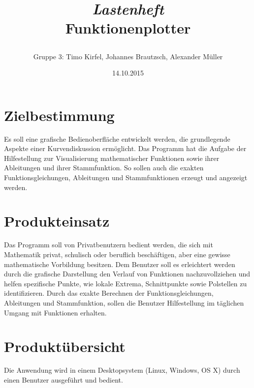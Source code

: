 \documentclass[a4paper]{article}
\title{\begin{center}
        \emph{{\Huge Lastenheft}} \\ {\large Funktionenplotter}
       \end{center} }
\author{{\normalsize Gruppe 3: Timo Kirfel, Johannes Brautzsch, Alexander Müller}}
\date{14.10.2015}
\begin{document}
  \maketitle
  \newpage

  \tableofcontents %
  \newpage

  \section{Zielbestimmung}
    Es soll eine grafische Bedienoberfläche entwickelt werden, die grundlegende Aspekte einer Kurvendiskussion ermöglicht. 
    Das Programm hat die Aufgabe der Hilfestellung zur Visualisierung mathematischer Funktionen sowie ihrer Ableitungen und ihrer Stammfunktion. So sollen auch die exakten Funktionsgleichungen, Ableitungen und Stammfunktionen erzeugt und angezeigt werden.

  \section{Produkteinsatz}
    Das Programm soll von Privatbenutzern bedient werden, die sich mit Mathematik privat, schulisch oder beruflich beschäftigen, aber eine gewisse mathematische Vorbildung besitzen.
    Dem Benutzer soll es erleichtert werden durch die grafische Darstellung den Verlauf von Funktionen nachzuvollziehen und helfen spezifische Punkte, wie lokale Extrema, Schnittpunkte sowie Polstellen zu identifizieren.
    Durch das exakte Berechnen der Funktionsgleichungen, Ableitungen und Stammfunktion, sollen die Benutzer Hilfestellung im täglichen Umgang mit Funktionen erhalten.

  \section{Produktübersicht}
    Die Anwendung wird in einem Desktopsystem (Linux, Windows,  OS X) durch einen Benutzer ausgeführt und bedient.
\end{document}
